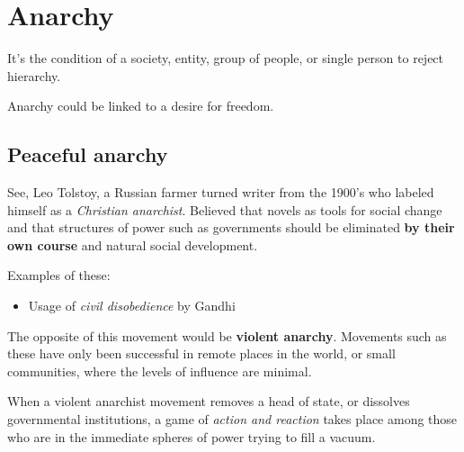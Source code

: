 
\section{Anarchy} 

It's the condition of a society, entity, group of people, or single person to reject hierarchy.

Anarchy could be linked to a desire for freedom. 

\subsection{Peaceful anarchy}

See, Leo Tolstoy, a Russian farmer turned writer from the 1900's who labeled himself as a \textit{Christian anarchist}. Believed that novels as tools for social change and that structures of power such as governments should be eliminated \textbf{by their own course} and natural social development. 

Examples of these:
\begin{itemize}
    \item Usage of \textit{civil disobedience} by Gandhi
\end{itemize}

The opposite of this movement would be \textbf{violent anarchy}.
Movements such as these have only been successful in remote places in the world, or small communities, where the levels of influence are minimal.

When a violent anarchist movement removes a head of state, or dissolves governmental institutions, a game of \textit{action and reaction} takes place among those who are in the immediate spheres of power trying to fill a vacuum.
